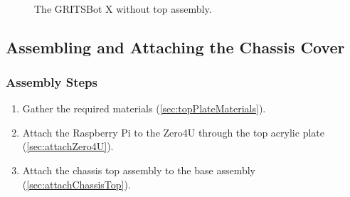 \begin{figure}[h!]
\centering
{}
\hfill
{}\\
\caption{The GRITSBot X without top assembly.}
\label{fig:attachPCB}
\end{figure}

\subsection{Assembling and Attaching the Chassis Cover}
\label{sec:topPlate}

\subsubsection{Assembly Steps}
\label{sec:topPlateSteps}

\begin{enumerate}
\item Gather the required materials (\cref{sec:topPlateMaterials}).
\item Attach the Raspberry Pi to the Zero4U through the top acrylic plate (\cref{sec:attachZero4U}).
\item Attach the chassis top assembly to the base assembly (\cref{sec:attachChassisTop}).
\end{enumerate}

